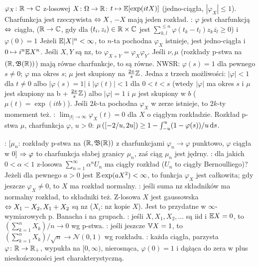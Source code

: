  $\varphi_X \colon \mathbb{R} \to \mathbb{C}$  z-losowej $X \colon \Omega \to \mathbb{R}$: $t \mapsto \mathbb{E} [\exp (itX)]$ (jedno-ciągła, $|\varphi_X| \le 1$).
Charfunkcja jest rzeczywista $\Leftrightarrow X$, $-X$ mają jeden rozkład.
: $\varphi$ jest charfunkcją $\Leftrightarrow$ ciągła,  ($\mathbb{R} \to \mathbb{C}$, gdy dla $(t_i, z_i) \in \mathbb{R} \times \mathbb{C}$ jest $\sum_{k,l}^{\le n} \varphi(t_k-t_l) z_k \overline{z_l} \ge 0$) i $\varphi(0) = 1$
Jeżeli $\mathbb{E} |X|^n < \infty$, to $n$-ta pochodna $\varphi_X$ istnieje, jest jedno-ciągła i $0 \mapsto i^n \mathbb{E} X^n$.
Jeśli $X, Y$ są nz, to $\varphi_{X + Y} = \varphi_X \varphi_Y$.
Jeśli $\nu, \mu$ (rozkłady p-stwa na $(\mathbb{R}, \mathfrak B (\mathbb{R}))$) mają równe charfunkcje, to są równe.
NWSR: $\varphi(s) = 1$ dla pewnego $s \neq 0$; $\varphi$ ma okres $s$; $\mu$ jest skupiony na $\frac{2 \pi}{s} \mathbb{Z}$.
Jedna z trzech możliwości: $|\varphi| < 1$ dla $t \neq 0$ albo $|\varphi(s) = 1|$ i $|\varphi(t)| < 1$ dla $0 < t < s$ (wtedy $|\varphi|$ ma okres $s$ i $\mu$ jest skupiony na b + $\frac{2\pi}s\mathbb{Z}$) albo $|\varphi| = 1$ i $\mu$ jest skupiony w $b$ ($\mu(t) = \exp(itb)$).
Jeśli $2k$-ta pochodna $\varphi_X$ w zerze istnieje, to $2k$-ty momement też.
: $\lim_{|t| \to \infty} \varphi_X(t) = 0$ dla $X$ o ciągłym rozkładzie.
Rozkład p-stwa $\mu$, charfunkcja $\varphi$, $u > 0$: $\mu \left(\left[-2/u, 2u \right] \right) \ge 1 - \int_{-u}^u (1 - \varphi(s))/u \, \textrm{d} s$.

:  [$\mu_n$: rozkłady p-stwa na $(\mathbb{R}, \mathfrak B(\mathbb{R}))$ z charfunkcjami $\varphi_n \to \varphi$ punktowo, $\varphi$ ciągła w $0$] $\Rightarrow \varphi$ to charfunkcja słabej granicy $\mu_n$, zaś ciąg $\mu_n$ jest jędrny.
: dla jakich $0 < \alpha < 1$ z-losowa $\sum_{n=1}^\infty \alpha^n U_n$ ma ciągły rozkład ($U_n$ to ciągły Bernoulliego)?
Jeżeli dla pewnego $a>0$ jest $\mathbb{E} \exp(aX^2) < \infty$, to funkcja $\varphi_X$ jest całkowita; gdy jeszcze $\varphi_X \neq 0$, to $X$ ma rozkład normalny.
: jeśli suma nz składników ma normalny rozkład, to składniki też.
Z-losowa $X$ jest gaussowska $\Leftrightarrow X_1 - X_2, X_1 + X_2$ są nz ($X_i$: nz kopie $X$).
Jest to przydatne w $\infty$-wymiarowych p. Banacha i na grupach.
: jeśli $X, X_1, X_2, \dots$ są iid i $\mathbb{E} X = 0$, to $(\sum_{k=1}^n X_k)/n \to 0$ wg p-stwa.
: jeśli jeszcze $\mathbb{V} X = 1$, to $(\sum_{k=1}^n X_k)/\sqrt{n} \to \mathcal N(0,1)$ wg rozkładu.
: każda ciągła, parzysta $\varphi \colon \mathbb{R} \to \mathbb{R}_+$, wypukła na $[0, \infty)$, nierosnąca, $\varphi(0) = 1$ i dążąca do zera w plus nieskończoności jest charakterystyczną.

